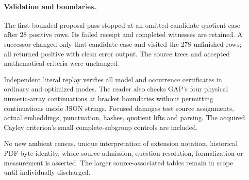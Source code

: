 \documentclass[11pt]{article}
\begin{document}
\paragraph{Validation and boundaries.}
The first bounded proposal pass stopped at an omitted candidate quotient
case after 28 positive rows. Its failed receipt and completed witnesses
are retained. A successor changed only that candidate case and visited
the 278 unfinished rows; all returned positive with clean error output.
The source trees and accepted mathematical criteria were unchanged.

Independent literal replay verifies all model and occurrence certificates
in ordinary and optimized modes. The reader also checks GAP's four physical
numeric-array continuations at bracket boundaries without permitting
continuations inside JSON strings. Focused damages test source assignments,
actual embeddings, punctuation, hashes, quotient lifts and parsing. The
acquired Cayley criterion's small complete-subgroup controls are included.

No new ambient census, unique interpretation of extension notation,
historical PDF-byte identity, whole-source admission, question resolution,
formalization or measurement is asserted. The larger source-associated
tables remain in scope until individually discharged.
\end{document}

